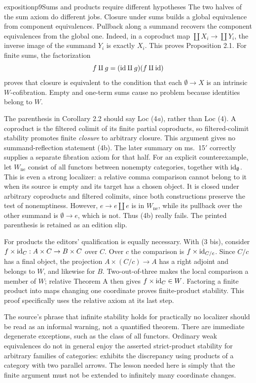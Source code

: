 \begin{dcomment}{exposition}{p9}{Sums and products require different hypotheses}
The two halves of the sum axiom do different jobs. Closure under sums builds a global equivalence from component equivalences. Pullback along a summand recovers the component equivalences from the global one. Indeed, in a coproduct map $\coprod X_i\to\coprod Y_i$, the inverse image of the summand $Y_i$ is exactly $X_i$. This proves Proposition 2.1. For finite sums, the factorization
\[
f\amalg g=(\mathrm{id}\amalg g)(f\amalg\mathrm{id})
\]
proves that closure is equivalent to the condition that each $\emptyset\to X$ is an intrinsic $W$-cofibration. Empty and one-term sums cause no problem because identities belong to $W$.

The parenthesis in Corollary 2.2 should say Loc (4\emph{a}), rather than Loc (4). A coproduct is the filtered colimit of its finite partial coproducts, so filtered-colimit stability promotes finite \emph{closure} to arbitrary closure. This argument gives no summand-reflection statement (4b). The later summary on ms.~15$'$ correctly supplies a separate fibration axiom for that half. For an explicit counterexample, let $W_{\mathrm{ne}}$ consist of all functors between nonempty categories, together with $\mathrm{id}_\emptyset$. This is even a strong localizer: a relative comma comparison cannot belong to it when its source is empty and its target has a chosen object. It is closed under arbitrary coproducts and filtered colimits, since both constructions preserve the test of nonemptiness. However, $e\to e\amalg e$ is in $W_{\mathrm{ne}}$, while its pullback over the other summand is $\emptyset\to e$, which is not. Thus (4b) really fails. The printed parenthesis is retained as an edition slip.

For products the editors' qualification is equally necessary. With (3 bis), consider $f\times\mathrm{id}_C:A\times C\to B\times C$ over $C$. Over $c$ the comparison is $f\times\mathrm{id}_{C/c}$. Since $C/c$ has a final object, the projection $A\times(C/c)\to A$ has a right adjoint and belongs to $W$, and likewise for $B$. Two-out-of-three makes the local comparison a member of $W$; relative Theorem A then gives $f\times\mathrm{id}_C\in W$. Factoring a finite product into maps changing one coordinate proves finite-product stability. This proof specifically uses the relative axiom at its last step.

The source's phrase that infinite stability holds for practically no localizer should be read as an informal warning, not a quantified theorem. There are immediate degenerate exceptions, such as the class of all functors. Ordinary weak equivalences do not in general enjoy the asserted strict-product stability for arbitrary families of categories: \citet[pp.~306--308]{Thomason1980} exhibits the discrepancy using products of a category with two parallel arrows. The lesson needed here is simply that the finite argument must not be extended to infinitely many coordinate changes.
\end{dcomment}


